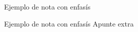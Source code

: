 \documentclass{article}
\begin{document}
\begin{tcolorbox}[colback=red!5,colframe=red!75!black]
Ejemplo de nota con enfas\'is
\end{tcolorbox}

\begin{tcolorbox}[]
Ejemplo de nota con enfas\'is
\tcblower
Apunte extra
\end{tcolorbox}
\end{document}
